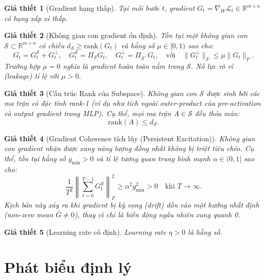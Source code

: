 \documentclass[11pt,a4paper]{article}
\newtheorem{assumption}{Giả thiết}
\newcommand{\rank}{\mathrm{rank}}
\newcommand{\RR}{\mathbb{R}}
\newcommand{\cL}{\mathcal{L}}
\newcommand{\cS}{\mathcal{S}}
\begin{document}
\begin{assumption}[Gradient hạng thấp]
\label{ass:low_rank_grad}
Tại mỗi bước $t$, gradient $G_t = \nabla_W \cL_t \in \RR^{m \times n}$ có hạng xấp xỉ thấp.
\end{assumption}

\begin{assumption}[Không gian con gradient ổn định]
\label{ass:subspace_stable}
Tồn tại một không gian con $\cS \subset \RR^{m \times n}$ có chiều $d_{\cS} \ge \rank(G_t)$ và hằng số $\mu \in [0, 1)$ sao cho:
\[
G_t = G_t^{\cS} + G_t^{\perp}, \quad G_t^{\cS} = \Pi_{\cS} G_t, \quad G_t^{\perp} = \Pi_{\cS^\perp} G_t, \quad \text{với} \quad \|G_t^{\perp}\|_F \leq \mu \|G_t\|_F.
\]
Trường hợp $\mu = 0$ nghĩa là gradient hoàn toàn nằm trong $\cS$. Nỗ lực rò rỉ (leakage) tỉ lệ với $\mu > 0$.
\end{assumption}

\begin{assumption}[Cấu trúc Rank của Subspace]
\label{ass:rank_structure}
Không gian con $\cS$ được sinh bởi các ma trận có đặc tính rank-1 (ví dụ như tích ngoài outer-product của pre-activation và output gradient trong MLP). Cụ thể, mọi ma trận $A \in \cS$ đều thỏa mãn:
\[
\rank(A) \leq d_{\cS}.
\]
\end{assumption}

\begin{assumption}[Gradient Coherence tích lũy (Persistent Excitation)]
\label{ass:persistent}
Không gian con gradient nhận được xung năng lượng đồng nhất không bị triệt tiêu chéo. Cụ thể, tồn tại hằng số $g_{\min} > 0$ và tỉ lệ tương quan trung bình mạnh $\alpha \in (0,1]$ sao cho:
\[
\frac{1}{T^2} \left\| \sum_{t=0}^{T-1} G_t^{\cS} \right\|_F^2 \geq \alpha^2 g_{\min}^2 > 0 \quad \text{khi } T \to \infty.
\]
Kịch bản này xảy ra khi gradient bị kỳ vọng (drift) dồn vào một hướng nhất định (non-zero mean $\bar{G} \neq 0$), thay vì chỉ là biến động ngẫu nhiên xung quanh 0.
\end{assumption}

\begin{assumption}[Learning rate cố định]
Learning rate $\eta > 0$ là hằng số.
\end{assumption}

\section{Phát biểu định lý}
\end{document}
